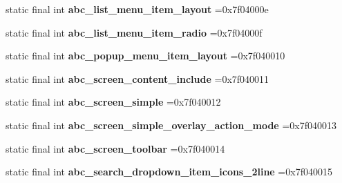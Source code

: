 \begin{DoxyCompactItemize}
\item 
\hypertarget{classcheck_1_1test_1_1_r_1_1layout_a81d4330e48d2b8423d60ed67df254f8a}{}static final int {\bfseries abc\+\_\+list\+\_\+menu\+\_\+item\+\_\+layout} =0x7f04000e\label{classcheck_1_1test_1_1_r_1_1layout_a81d4330e48d2b8423d60ed67df254f8a}

\item 
\hypertarget{classcheck_1_1test_1_1_r_1_1layout_a99f6231629ea8add89c64528ff568b15}{}static final int {\bfseries abc\+\_\+list\+\_\+menu\+\_\+item\+\_\+radio} =0x7f04000f\label{classcheck_1_1test_1_1_r_1_1layout_a99f6231629ea8add89c64528ff568b15}

\item 
\hypertarget{classcheck_1_1test_1_1_r_1_1layout_a9b6e405395c9478a75ed824f078b9683}{}static final int {\bfseries abc\+\_\+popup\+\_\+menu\+\_\+item\+\_\+layout} =0x7f040010\label{classcheck_1_1test_1_1_r_1_1layout_a9b6e405395c9478a75ed824f078b9683}

\item 
\hypertarget{classcheck_1_1test_1_1_r_1_1layout_a968b8b84f99b16aaa1cf6658da3dfc54}{}static final int {\bfseries abc\+\_\+screen\+\_\+content\+\_\+include} =0x7f040011\label{classcheck_1_1test_1_1_r_1_1layout_a968b8b84f99b16aaa1cf6658da3dfc54}

\item 
\hypertarget{classcheck_1_1test_1_1_r_1_1layout_abc88d91c1b1754fde66818f940268eca}{}static final int {\bfseries abc\+\_\+screen\+\_\+simple} =0x7f040012\label{classcheck_1_1test_1_1_r_1_1layout_abc88d91c1b1754fde66818f940268eca}

\item 
\hypertarget{classcheck_1_1test_1_1_r_1_1layout_a62b5fa2c61ac07e83b36ee864ec08ab8}{}static final int {\bfseries abc\+\_\+screen\+\_\+simple\+\_\+overlay\+\_\+action\+\_\+mode} =0x7f040013\label{classcheck_1_1test_1_1_r_1_1layout_a62b5fa2c61ac07e83b36ee864ec08ab8}

\item 
\hypertarget{classcheck_1_1test_1_1_r_1_1layout_a068e6eee8182305fb8588f22c7022e43}{}static final int {\bfseries abc\+\_\+screen\+\_\+toolbar} =0x7f040014\label{classcheck_1_1test_1_1_r_1_1layout_a068e6eee8182305fb8588f22c7022e43}

\item 
\hypertarget{classcheck_1_1test_1_1_r_1_1layout_aa8a06790498d3bc43fa197603040a7aa}{}static final int {\bfseries abc\+\_\+search\+\_\+dropdown\+\_\+item\+\_\+icons\+\_\+2line} =0x7f040015\label{classcheck_1_1test_1_1_r_1_1layout_aa8a06790498d3bc43fa197603040a7aa}


\end{DoxyCompactItemize}
